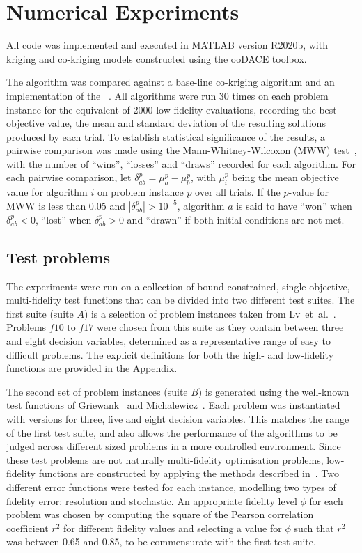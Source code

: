 \section{Numerical Experiments}\label{sec:exp}
All code was implemented and executed in MATLAB version R2020b, with kriging and co-kriging models constructed using the ooDACE toolbox.

The \AlgName{} algorithm was compared against a base-line co-kriging algorithm and an implementation of the \motos{}~\cite{xu2016mo2tos}. All algorithms were run 30 times on each problem instance for the equivalent of 2000 low-fidelity evaluations, recording the best objective value, the mean and standard deviation of the resulting solutions produced by each trial. To establish statistical significance of the results, a pairwise comparison was made using the Mann-Whitney-Wilcoxon (MWW) test~\cite{mann1947test}, with the number of ``wins'', ``losses'' and ``draws'' recorded for each algorithm. For each pairwise comparison, let $\delta^p_{ab} = \mu^p_a - \mu^p_b$, with $\mu^p_i$ being the mean objective value for algorithm $i$ on problem instance $p$ over all trials. If the $p$-value for MWW is less than 0.05 and $|\delta^p_{ab}| > 10^{-5}$, algorithm $a$ is said to have ``won'' when $\delta^p_{ab} < 0$, ``lost'' when $\delta^p_{ab} > 0$ and ``drawn'' if both initial conditions are not met.

\subsection{Test problems}
The experiments were run on a collection of bound-constrained, single-objective, multi-fidelity test functions that can be divided into two different test suites. The first suite (suite $A$) is a selection of problem instances taken from Lv~et~al.~\cite{lv2021multi}. Problems $f10$ to $f17$ were chosen from this suite as they contain between three and eight decision variables, determined as a representative range of easy to difficult problems. The explicit definitions for both the high- and low-fidelity functions are provided in the Appendix.

The second set of problem instances (suite $B$) is generated using the well-known test functions of Griewank~\cite{griewank1981generalized} and Michalewicz~\cite{michalewicz2013genetic}. Each problem was instantiated with versions for three, five and eight decision variables. This matches the range of the first test suite, and also allows the performance of the algorithms to be judged across different sized problems in a more controlled environment. Since these test problems are not naturally multi-fidelity optimisation problems, low-fidelity functions are constructed by applying the methods described in~\cite{wang2017generic}. Two different error functions were tested for each instance, modelling two types of fidelity error: resolution and stochastic. An appropriate fidelity level $\phi$ for each problem was chosen by computing the square of the Pearson correlation coefficient $r^2$ for different fidelity values and selecting a value for $\phi$ such that $r^2$ was between 0.65 and 0.85, to be commensurate with the first test suite.

